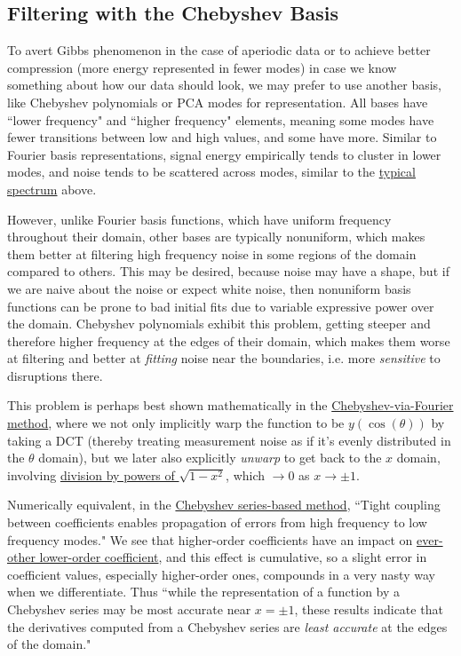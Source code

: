 \documentclass[10pt]{article}
\begin{document}
\subsection{Filtering with the Chebyshev Basis}

To avert Gibbs phenomenon in the case of aperiodic data or to achieve better compression (more energy represented in fewer modes) in case we know something about how our data should look, we may prefer to use another basis, like Chebyshev polynomials or PCA modes for representation. All bases have ``lower frequency" and ``higher frequency" elements, meaning some modes have fewer transitions between low and high values, and some have more. Similar to Fourier basis representations, signal energy empirically tends to cluster in lower modes, and noise tends to be scattered across modes, similar to the \hyperref[spectrum]{typical spectrum} above.

However, unlike Fourier basis functions, which have uniform frequency throughout their domain, other bases are typically nonuniform, which makes them better at filtering high frequency noise in some regions of the domain compared to others. This may be desired, because noise may have a shape, but if we are naive about the noise or expect white noise, then nonuniform basis functions can be prone to bad initial fits due to variable expressive power over the domain. Chebyshev polynomials exhibit this problem, getting steeper and therefore higher frequency at the edges of their domain, which makes them worse at filtering and better at \textit{fitting} noise near the boundaries, i.e. more \textit{sensitive} to disruptions there.

This problem is perhaps best shown mathematically in the \hyperref[algo]{Chebyshev-via-Fourier method}, where we not only implicitly warp the function to be $y(\cos(\theta))$ by taking a DCT (thereby treating measurement noise as if it's evenly distributed in the $\theta$ domain), but we later also explicitly \textit{unwarp} to get back to the $x$ domain, involving \hyperref[pyramid]{division by powers of $\sqrt{1-x^2}$}\cite{brown}\cite{trefethen8}, which $ \rightarrow 0$ as $x \rightarrow \pm 1$.

Numerically equivalent, in the \hyperref[seriesrule]{Chebyshev series-based method}, ``Tight coupling between coefficients enables propagation of errors from high frequency to low frequency modes."\cite{brown} We see that higher-order coefficients have an impact on \href{https://scicomp.stackexchange.com/q/44939/48402}{ever-other lower-order coefficient}\cite{dcoefs}, and this effect is cumulative, so a slight error in coefficient values, especially higher-order ones, compounds in a very nasty way when we differentiate. Thus ``while the representation of a function by a Chebyshev series may be most accurate near $x = \pm 1$, these results indicate that the derivatives computed from a Chebyshev series are \textit{least accurate} at the edges of the domain."\cite{brown}
\end{document}
